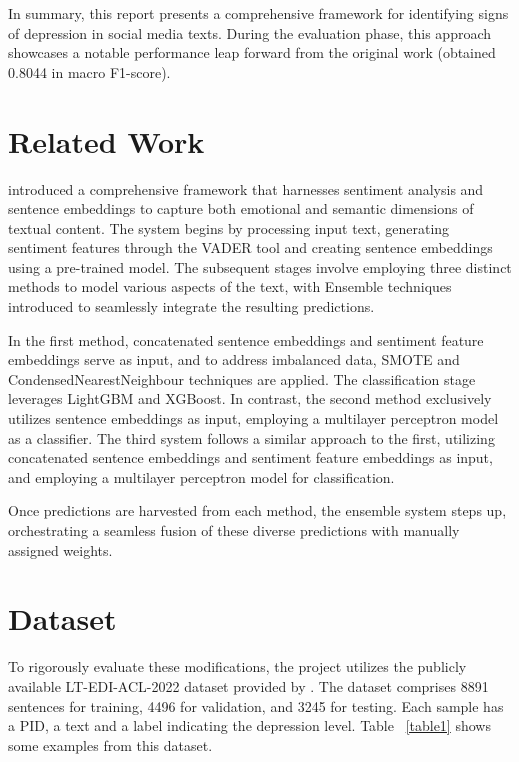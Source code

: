 \documentclass{article}
\begin{document}
In summary, this report presents a comprehensive framework for identifying signs of depression in social media texts. During the evaluation phase, this approach showcases a notable performance leap forward from the original work (obtained 0.8044 in macro F1-score).

\section{Related Work}

\citep{wang2022nycu_twd} introduced a comprehensive framework that harnesses sentiment analysis and sentence embeddings to capture both emotional and semantic dimensions of textual content. The system begins by processing input text, generating sentiment features through the VADER tool and creating sentence embeddings using a pre-trained model. The subsequent stages involve employing three distinct methods to model various aspects of the text, with Ensemble techniques introduced to seamlessly integrate the resulting predictions.

In the first method, concatenated sentence embeddings and sentiment feature embeddings serve as input, and to address imbalanced data, SMOTE and CondensedNearestNeighbour techniques are applied. The classification stage leverages LightGBM and XGBoost. In contrast, the second method exclusively utilizes sentence embeddings as input, employing a multilayer perceptron model as a classifier. The third system follows a similar approach to the first, utilizing concatenated sentence embeddings and sentiment feature embeddings as input, and employing a multilayer perceptron model for classification.

Once predictions are harvested from each method, the ensemble system steps up, orchestrating a seamless fusion of these diverse predictions with manually assigned weights.

\section{Dataset}

To rigorously evaluate these modifications, the project utilizes the publicly available LT-EDI-ACL-2022 dataset provided by \citep{kayalvizhi2022findings}. The dataset comprises 8891 sentences for training, 4496 for validation, and 3245 for testing. Each sample has a PID, a text and a label indicating the depression level. Table ~\ref{table1} shows some examples from this dataset.
\end{document}
